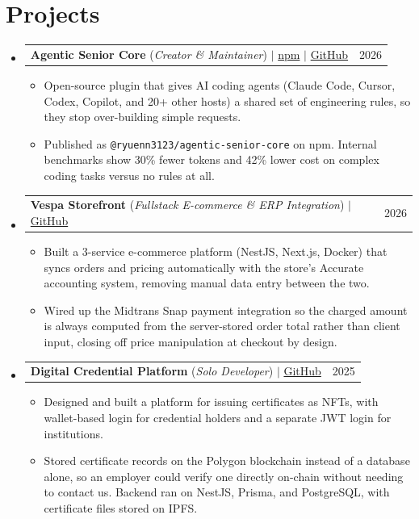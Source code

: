 \documentclass[letterpaper,11pt]{article}
\makeatletter
\newcommand{\resumeItem}[1]{
  \item\small{
    {#1 \vspace{-2pt}}
  }
}
\newcommand{\resumeProjectHeading}[2]{
    \item
    \begin{tabular*}{0.97\textwidth}{l@{\extracolsep{\fill}}r}
      \small#1 & #2 \\
    \end{tabular*}\vspace{-5pt}
}
\newcommand{\resumeSubHeadingListStart}{\begin{itemize}[leftmargin=0.15in, label={}]}
\newcommand{\resumeSubHeadingListEnd}{\end{itemize}}
\newcommand{\resumeItemListStart}{\begin{itemize}[itemsep=0pt, topsep=0pt, parsep=2pt]}
\newcommand{\resumeItemListEnd}{\end{itemize}\vspace{1pt}}
\makeatother
\begin{document}
\section{Projects}
    \resumeSubHeadingListStart

      \resumeProjectHeading
          {\textbf{Agentic Senior Core} (\emph{Creator \& Maintainer}) $|$
          \href{https://www.npmjs.com/package/@ryuenn3123/agentic-senior-core}{npm} $|$
          \href{https://github.com/fatidaprilian/Agentic-Senior-Core}{GitHub}}{2026}
          \resumeItemListStart
            \resumeItem{Open-source plugin that gives AI coding agents (Claude Code, Cursor, Codex, Copilot, and 20+ other hosts) a shared set of engineering rules, so they stop over-building simple requests.}
            \resumeItem{Published as \texttt{@ryuenn3123/agentic-senior-core} on npm. Internal benchmarks show 30\% fewer tokens and 42\% lower cost on complex coding tasks versus no rules at all.}
          \resumeItemListEnd

      \resumeProjectHeading
          {\textbf{Vespa Storefront} (\emph{Fullstack E-commerce \& ERP Integration}) $|$
          \href{https://github.com/fatidaprilian/ecommercevespa-client}{GitHub}}{2026}
          \resumeItemListStart
            \resumeItem{Built a 3-service e-commerce platform (NestJS, Next.js, Docker) that syncs orders and pricing automatically with the store's Accurate accounting system, removing manual data entry between the two.}
            \resumeItem{Wired up the Midtrans Snap payment integration so the charged amount is always computed from the server-stored order total rather than client input, closing off price manipulation at checkout by design.}
          \resumeItemListEnd

      \resumeProjectHeading
          {\textbf{Digital Credential Platform} (\emph{Solo Developer}) $|$
          \href{https://github.com/fatidaprilian/digital-credential-platform}{GitHub}}{2025}
          \resumeItemListStart
            \resumeItem{Designed and built a platform for issuing certificates as NFTs, with wallet-based login for credential holders and a separate JWT login for institutions.}
            \resumeItem{Stored certificate records on the Polygon blockchain instead of a database alone, so an employer could verify one directly on-chain without needing to contact us. Backend ran on NestJS, Prisma, and PostgreSQL, with certificate files stored on IPFS.}
          \resumeItemListEnd

    \resumeSubHeadingListEnd
\end{document}
